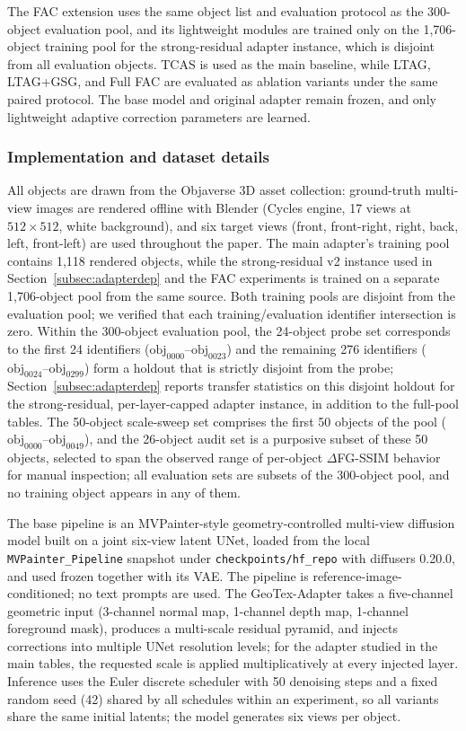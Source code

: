\documentclass[times,twocolumn,final]{elsarticle}
\begin{document}
The FAC extension uses the same object list and evaluation protocol as the 300-object evaluation pool, and its lightweight modules are trained only on the 1,706-object training pool for the strong-residual adapter instance, which is disjoint from all evaluation objects. TCAS is used as the main baseline, while LTAG, LTAG+GSG, and Full FAC are evaluated as ablation variants under the same paired protocol. The base model and original adapter remain frozen, and only lightweight adaptive correction parameters are learned.

\subsubsection{Implementation and dataset details}

All objects are drawn from the Objaverse 3D asset collection: ground-truth multi-view images are rendered offline with Blender (Cycles engine, 17 views at $512\times512$, white background), and six target views (front, front-right, right, back, left, front-left) are used throughout the paper. The main adapter's training pool contains 1{,}118 rendered objects, while the strong-residual v2 instance used in Section~\ref{subsec:adapterdep} and the FAC experiments is trained on a separate 1{,}706-object pool from the same source. Both training pools are disjoint from the evaluation pool; we verified that each training/evaluation identifier intersection is zero. Within the 300-object evaluation pool, the 24-object probe set corresponds to the first 24 identifiers ($\mathrm{obj}_{0000}$--$\mathrm{obj}_{0023}$) and the remaining 276 identifiers ($\mathrm{obj}_{0024}$--$\mathrm{obj}_{0299}$) form a holdout that is strictly disjoint from the probe; Section~\ref{subsec:adapterdep} reports transfer statistics on this disjoint holdout for the strong-residual, per-layer-capped adapter instance, in addition to the full-pool tables. The 50-object scale-sweep set comprises the first 50 objects of the pool ($\mathrm{obj}_{0000}$--$\mathrm{obj}_{0049}$), and the 26-object audit set is a purposive subset of these 50 objects, selected to span the observed range of per-object $\Delta$FG-SSIM behavior for manual inspection; all evaluation sets are subsets of the 300-object pool, and no training object appears in any of them.

The base pipeline is an MVPainter-style geometry-controlled multi-view diffusion model built on a joint six-view latent UNet, loaded from the local \texttt{MVPainter\_Pipeline} snapshot under \texttt{checkpoints/hf\_repo} with diffusers 0.20.0, and used frozen together with its VAE. The pipeline is reference-image-conditioned; no text prompts are used. The GeoTex-Adapter takes a five-channel geometric input (3-channel normal map, 1-channel depth map, 1-channel foreground mask), produces a multi-scale residual pyramid, and injects corrections into multiple UNet resolution levels; for the adapter studied in the main tables, the requested scale is applied multiplicatively at every injected layer. Inference uses the Euler discrete scheduler with 50 denoising steps and a fixed random seed (42) shared by all schedules within an experiment, so all variants share the same initial latents; the model generates six views per object.
\end{document}
